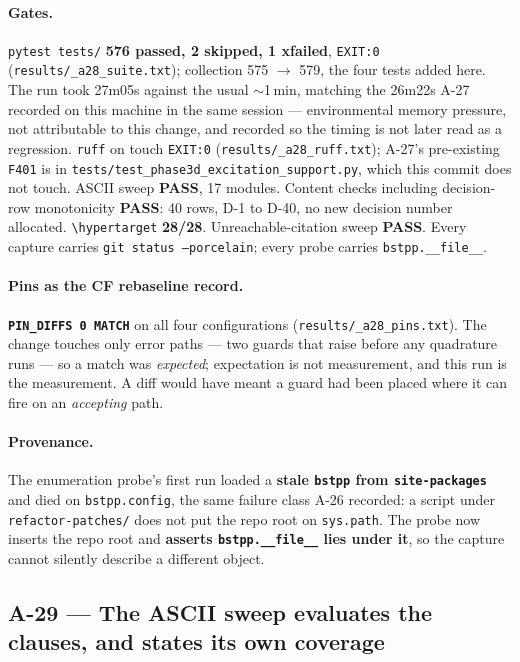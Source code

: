 \documentclass[
  10pt,
]{article}
\begin{document}
\paragraph{Gates.}
\texttt{pytest tests/} \textbf{576 passed, 2 skipped, 1 xfailed}, \texttt{EXIT:0} (\texttt{results/\allowbreak{}\_a28\_suite.txt}); collection 575 $\rightarrow$ 579, the four tests added here. The run took 27m05s against the usual $\sim$1\,min, matching the 26m22s A-27 recorded on this machine in the same session --- environmental memory pressure, not attributable to this change, and recorded so the timing is not later read as a regression. \texttt{ruff} on touch \texttt{EXIT:0} (\texttt{results/\allowbreak{}\_a28\_ruff.txt}); A-27's pre-existing \texttt{F401} is in \texttt{tests/test\_phase3d\_excitation\_support.py}, which this commit does not touch. ASCII sweep \textbf{PASS}, 17 modules. Content checks including decision-row monotonicity \textbf{PASS}: 40 rows, D-1 to D-40, no new decision number allocated. \texttt{\textbackslash hypertarget} \textbf{28/28}. Unreachable-citation sweep \textbf{PASS}. Every capture carries \texttt{git status --porcelain}; every probe carries \texttt{bstpp.\_\_file\_\_}.

\paragraph{Pins as the CF rebaseline record.}
\textbf{\texttt{PIN\_DIFFS 0 MATCH}} on all four configurations (\texttt{results/\allowbreak{}\_a28\_pins.txt}). The change touches only error paths --- two guards that raise before any quadrature runs --- so a match was \emph{expected}; expectation is not measurement, and this run is the measurement. A diff would have meant a guard had been placed where it can fire on an \emph{accepting} path.

\paragraph{Provenance.}
The enumeration probe's first run loaded a \textbf{stale \texttt{bstpp} from \texttt{site-packages}} and died on \texttt{bstpp.config}, the same failure class A-26 recorded: a script under \texttt{refactor-patches/} does not put the repo root on \texttt{sys.path}. The probe now inserts the repo root and \textbf{asserts \texttt{bstpp.\_\_file\_\_} lies under it}, so the capture cannot silently describe a different object.

\hypertarget{a-29}{%
\subsection{A-29 --- The ASCII sweep evaluates the clauses, and states its own coverage}\label{a-29}}
\end{document}
